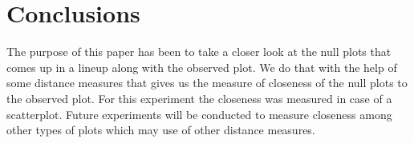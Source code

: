 \section{Conclusions} \label{sec:conclusions}
The purpose of this paper has been to take a closer look at the null plots that comes up in a lineup along with the observed plot. We do that with the help of some distance measures that gives us the measure of closeness of the null plots to the observed plot. For this experiment the closeness was measured in case of a scatterplot. Future experiments will be conducted to measure closeness among other types of plots which may use of other distance measures.



